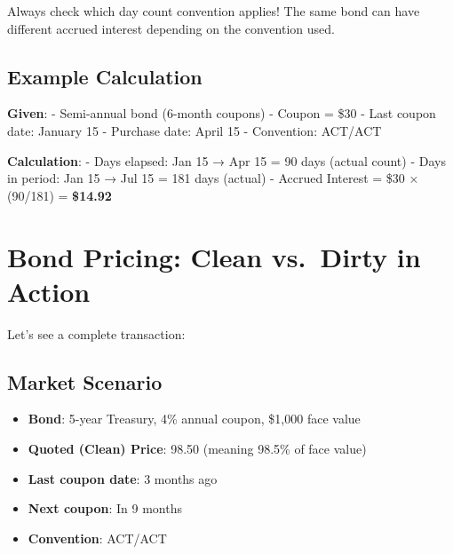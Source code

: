 \documentclass[
  letterpaper,
]{scrbook}
\providecommand{\tightlist}{%
  \setlength{\itemsep}{0pt}\setlength{\parskip}{0pt}}
\begin{document}
\FloatBarrier

\begin{tcolorbox}[enhanced jigsaw, toptitle=1mm, colbacktitle=quarto-callout-warning-color!10!white, opacityback=0, leftrule=.75mm, breakable, colframe=quarto-callout-warning-color-frame, toprule=.15mm, opacitybacktitle=0.6, coltitle=black, bottomrule=.15mm, colback=white, arc=.35mm, titlerule=0mm, rightrule=.15mm, left=2mm, title=\textcolor{quarto-callout-warning-color}{\faExclamationTriangle}\hspace{0.5em}{Common Pitfall}, bottomtitle=1mm]

Always check which day count convention applies! The same bond can have
different accrued interest depending on the convention used.

\end{tcolorbox}

\subsection{Example Calculation}\label{example-calculation}

\textbf{Given}: - Semi-annual bond (6-month coupons) - Coupon = \$30 -
Last coupon date: January 15 - Purchase date: April 15 - Convention:
ACT/ACT

\textbf{Calculation}: - Days elapsed: Jan 15 → Apr 15 = 90 days (actual
count) - Days in period: Jan 15 → Jul 15 = 181 days (actual) - Accrued
Interest = \$30 × (90/181) = \textbf{\$14.92}

\section{Bond Pricing: Clean vs.~Dirty in
Action}\label{bond-pricing-clean-vs.-dirty-in-action}

Let's see a complete transaction:

\subsection{Market Scenario}\label{market-scenario}

\begin{itemize}
\tightlist
\item
  \textbf{Bond}: 5-year Treasury, 4\% annual coupon, \$1,000 face value
\item
  \textbf{Quoted (Clean) Price}: 98.50 (meaning 98.5\% of face value)
\item
  \textbf{Last coupon date}: 3 months ago
\item
  \textbf{Next coupon}: In 9 months
\item
  \textbf{Convention}: ACT/ACT
\end{itemize}
\end{document}
